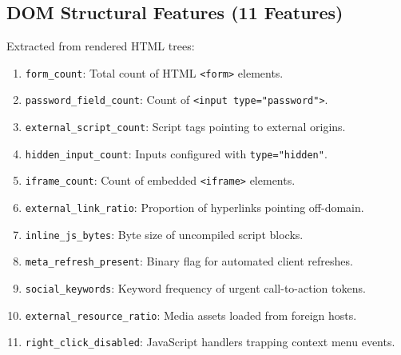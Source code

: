 \documentclass[conference]{IEEEtran}
\begin{document}
\subsection{DOM Structural Features (11 Features)}
Extracted from rendered HTML trees:
\begin{enumerate}[leftmargin=*,nosep]
\item \texttt{form\_count}: Total count of HTML \texttt{<form>} elements.
\item \texttt{password\_field\_count}: Count of \texttt{<input type="password">}.
\item \texttt{external\_script\_count}: Script tags pointing to external origins.
\item \texttt{hidden\_input\_count}: Inputs configured with \texttt{type="hidden"}.
\item \texttt{iframe\_count}: Count of embedded \texttt{<iframe>} elements.
\item \texttt{external\_link\_ratio}: Proportion of hyperlinks pointing off-domain.
\item \texttt{inline\_js\_bytes}: Byte size of uncompiled script blocks.
\item \texttt{meta\_refresh\_present}: Binary flag for automated client refreshes.
\item \texttt{social\_keywords}: Keyword frequency of urgent call-to-action tokens.
\item \texttt{external\_resource\_ratio}: Media assets loaded from foreign hosts.
\item \texttt{right\_click\_disabled}: JavaScript handlers trapping context menu events.
\end{enumerate}
\end{document}
